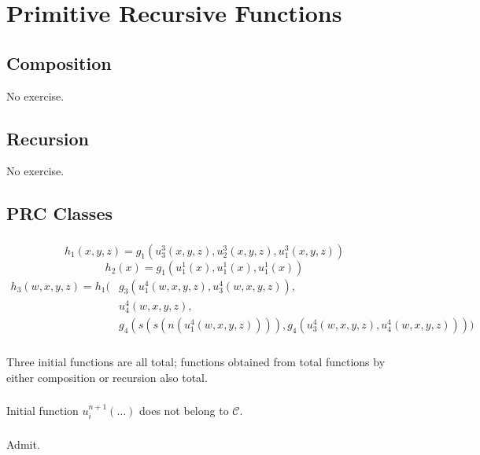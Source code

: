 \chapter{Primitive Recursive Functions}

\section{Composition}
No exercise.


\section{Recursion}
No exercise.


\section{PRC Classes}

\subsection{}
\[ h_{1}(x, y, z) = g_{1}(u^{3}_{3}(x, y, z), u^{3}_{2}(x, y, z), u^{3}_{1}(x, y, z)) \]
\[ h_{2}(x) = g_{1}(u^{1}_{1}(x), u^{1}_{1}(x), u^{1}_{1}(x)) \]
\[
\begin{split}
h_{3}(w, x, y, z) = h_{1}( & g_{3}(u^{4}_{1}(w, x, y, z), u^{4}_{3}(w, x, y, z)), \\
                           & u^{4}_{4}(w, x, y, z), \\
                           & g_{4}( s(s(n(u^{4}_{1}(w, x, y, z)))), g_{4}(u^{4}_{3}(w, x, y, z), u^{4}_{4}(w, x, y, z))))
\end{split}
\]


\subsection{}
Three initial functions are all total; functions obtained from total functions
by either composition or recursion also total.

\subsection{}
Initial function $ u^{n+1}_{i}(\dots) $ does not belong to $ \mathscr{C} $.

\subsection{}
Admit.

